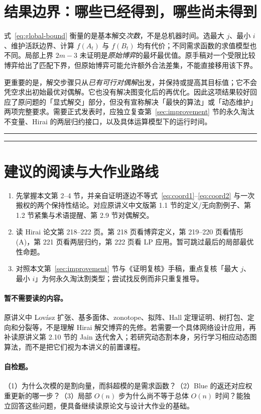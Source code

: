 \documentclass[UTF8,11pt,a4paper]{ctexart}
\newcommand{\progressrule}{\par\medskip\noindent\rule{\linewidth}{0.65pt}\par\medskip}
\newcommand{\ownrule}{\par\medskip\noindent\textcolor{red}{\rule{\linewidth}{1pt}}\par\medskip}
\begin{document}
\section{结果边界：哪些已经得到，哪些尚未得到}
\label{sec:limits}

式~\eqref{eq:global-bound} 衡量的是基本解交\emph{次数}，不是总机器时间。选最大 $j$、最小 $i$、维护活跃边界、计算 $f(A_t)$ 与 $f(B_t)$ 均有代价；不同需求函数的求值模型也不同。局部上界 $2m-3$ 未证明是\emph{原始博弈}的最坏最优值。原手稿对一个受限比较博弈给出了匹配下界，但原始博弈可能允许额外合法差集，不能直接移用该下界。

更重要的是，解交步骤只从\emph{已有可行对偶解}出发，并保持或提高其目标值；它不会凭空求出初始最优对偶解。它也没有解决图变化后的再优化。因此这项结果较好回应了原问题的「显式解交」部分，但没有宣称解决「最快的算法」或「动态维护」两项完整要求。需要正式发表时，应独立复查第~\ref{sec:improvement} 节的永久淘汰不变量、Hirai 的两层归约接口，以及具体运算模型下的运行时间。

\ownrule
\progressrule
\section{建议的阅读与大作业路线}

\begin{enumerate}
\item 先掌握本文第 2--4 节，并亲自证明逐边不等式~\eqref{eq:coord1}--\eqref{eq:coord2} 与一次搬权的两个保持性结论。对应原讲义中文版第 1.1 节的定义/无向割例子、第 1.2 节紧集与术语提醒、第 2.9 节对偶解交。
\item 读 Hirai 论文第 218--222 页。第 218 页看博弈定义，第 219--220 页看情形 (A)，第 221 页看两层归约，第 222 页看 LP 应用。暂可跳过最后的局部最优性命题。
\item 对照本文第~\ref{sec:improvement} 节与《证明复核》手稿，重点复核「最大 $j$、最小 $i$」为何永久淘汰割类型；尝试找反例而非只重复推导。
\end{enumerate}

\paragraph{暂不需要读的内容。}原讲义中 Lov\'asz 扩张、基多面体、zonotope、拟阵、Hall 定理证明、树打包、定向和分裂等，不是理解 Hirai 解交博弈的先修。若需要一个具体网络设计应用，再补读原讲义第 2.10 节的 Jain 迭代舍入；若研究动态割本身，另行学习相应动态图算法，而不是把它们视为本讲义的前置课程。

\paragraph{自检题。}（1）为什么次模的是割向量，而斜超模的是需求函数？（2）Blue 的返还对应权重更新的哪一步？（3）局部 $O(n)$ 步为什么尚不等于总体 $O(n)$ 时间？能独立回答这些问题，便具备继续读原论文与设计大作业的基础。
\end{document}
